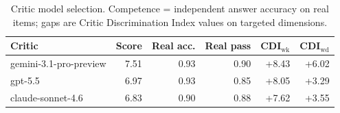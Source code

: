 \begin{table}[t]
\centering
\caption{Critic model selection. Competence = independent answer accuracy on real items; gaps are Critic Discrimination Index values on targeted dimensions.}
\label{tab:critic-selection}
\begin{tabular}{lrrrrr}
\hline
Critic & Score & Real acc. & Real pass & CDI$_\text{wk}$ & CDI$_\text{wd}$ \\
\hline
gemini-3.1-pro-preview & 7.51 & 0.93 & 0.90 & +8.43 & +6.02 \\
gpt-5.5 & 6.97 & 0.93 & 0.85 & +8.05 & +3.29 \\
claude-sonnet-4.6 & 6.83 & 0.90 & 0.88 & +7.62 & +3.55 \\
\hline
\end{tabular}
\end{table}

